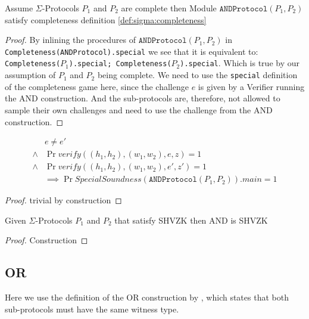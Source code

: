 \begin{lemma}
  Assume $\Sigma$-Protocols $P_{1}$ and $P_{2}$ are complete then
  Module $\texttt{ANDProtocol}(P_1, P_2)$ satisfy completeness definition \ref{def:sigma:completeness}
\end{lemma}
\begin{proof}
  By inlining the procedures of $\texttt{ANDProtocol}(P_{1}, P_{2})$ in
  \texttt{Completeness(ANDProtocol).special} we see that it is equivalent to:
  \texttt{Completeness($P_{1}$).special; Completeness($P_{2}$).special}. Which is true by our
  assumption of $P_{1}$ and $P_{2}$ being complete.
  We need to use the \texttt{special} definition of the completeness game here,
  since the challenge $e$ is given by a Verifier running the AND construction.
  And the sub-protocols are, therefore, not allowed to sample their own
  challenges and need to use the challenge from the AND construction.
\end{proof}


\begin{lemma}
  \begin{align*}
    & e \neq e' \\
    \land &\Pr{verify((h_{1}, h_{2}), (w_{1}, w_{2}), e, z)} = 1 \\
    \land &\Pr{verify((h_{1}, h_{2}), (w_{1}, w_{2}), e', z')} = 1 \\
    &\implies \Pr{SpecialSoundness(\texttt{ANDProtocol}(P_{1}, P_{2})).main} = 1
  \end{align*}
\end{lemma}
\begin{proof}
  trivial by construction
\end{proof}

\begin{lemma}
  Given $\Sigma$-Protocols $P_{1}$ and $P_{2}$ that satisfy SHVZK then AND is SHVZK
\end{lemma}
\begin{proof}
  Construction
\end{proof}

\subsection{OR}
\label{subsec:sigma_OR}
Here we use the definition of the OR construction by \cite{on-sigma-protocols},
which states that both sub-protocols must have the same witness type.

